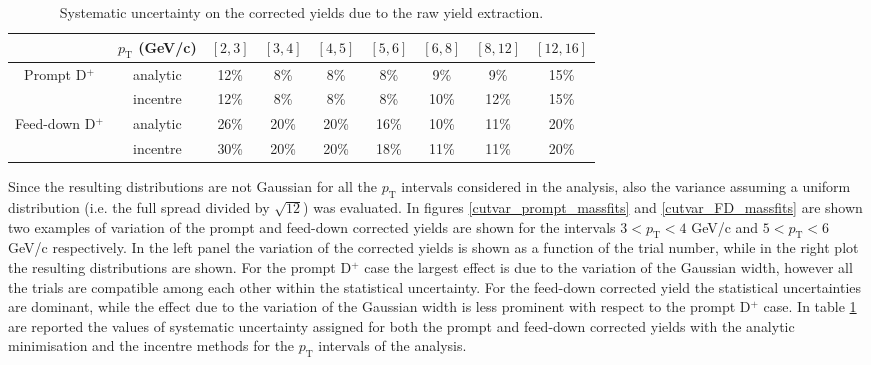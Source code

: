 \documentclass[b5paper,10pt,twoside,oldstyle,classica]{toptesi}
\newcommand{\pt}{p_\text{T}}
\begin{document}
\begin{table}[tb]
\centering 
\begin{center} %
\renewcommand\arraystretch{1.1} 
\fontsize{8.5}{11}\selectfont
\begin{tabular}{|c|c|c|c|c|c|c|c|c|}
\cline{2-9}
\multicolumn{1}{c|}{} & $\pt$ (GeV/c) & $[2,3]$ & $[3,4]$ & $[4,5]$ & $[5,6]$ & $[6,8]$ & $[8,12]$ & $[12,16]$\\
\hline
\multirow{2}{*}{Prompt D$^+$} & analytic & 12\% & 8\% & 8\% & 8\% & 9\% & 9\% & 15\%\\
& incentre & 12\% & 8\% & 8\% & 8\% & 10\% & 12\% & 15\%\\
\hline
\multirow{2}{*}{Feed-down D$^+$} & analytic & 26\% & 20\% & 20\% & 16\% & 10\% & 11\% & 20\%\\
& incentre & 30\% & 20\% & 20\% & 18\% & 11\% & 11\% & 20\%\\
\hline
\end{tabular} 
\caption{Systematic uncertainty on the corrected yields due to the raw yield extraction.}
\label{cutvar_syst_massfit_tab}
\end{center} 
\end{table} Since the resulting distributions are not Gaussian for all the $\pt$ intervals considered in the analysis, also the variance assuming a uniform distribution (i.e. the full spread divided by $\sqrt{12}$) was evaluated. In figures \ref{cutvar_prompt_massfits} and \ref{cutvar_FD_massfits} are shown two examples of variation of the prompt and feed-down corrected yields are shown for the intervals $3<\pt<4$ GeV/c and $5<\pt<6$ GeV/c respectively. In the left panel the variation of the corrected yields is shown as a function of the trial number, while in the right plot the resulting distributions are shown. For the prompt D$^+$ case the largest effect is due to the variation of the Gaussian width, however all the trials are compatible among each other within the statistical uncertainty. For the feed-down corrected yield the statistical uncertainties are dominant, while the effect due to the variation of the Gaussian width is less prominent with respect to the prompt D$^+$ case. In table \ref{cutvar_syst_massfit_tab} are reported the values of systematic uncertainty assigned for both the prompt and feed-down corrected yields with the analytic minimisation and the incentre methods for the $\pt$ intervals of the analysis.
\end{document}
